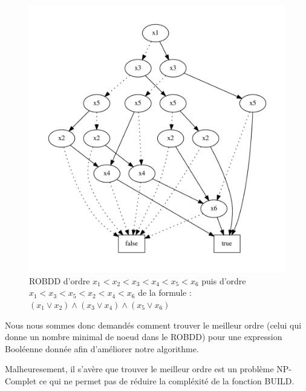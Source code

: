 \documentclass[a4paper, oneside]{report}
\begin{document}
\begin{figure}[h]
      \includegraphics[scale = 0.5]{exemple/mauvais_Ordre.pdf}
    \caption{ROBDD d'ordre $x_1<x_2<x_3<x_4<x_5<x_6$ puis d'ordre $x_1<x_3<x_5<x_2<x_4<x_6$ de la formule : $ (x_1 \vee x_2) \wedge (x_3 \vee x_4) \wedge (x_5 \vee x_6)$}
\end{figure}

Nous nous sommes donc demandés comment trouver le meilleur ordre (celui qui donne un nombre minimal de noeud dans le ROBDD) pour une expression Booléenne donnée afin d'améliorer notre algorithme.

Malheuresement, il s'avère que trouver le meilleur ordre est un problème NP-Complet ce qui ne permet pas de réduire la compléxité de la fonction BUILD.


\end{document}
